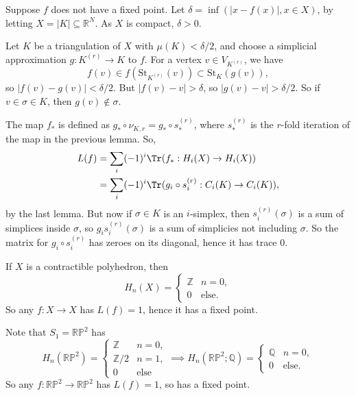 \documentclass[12pt]{article}
\begin{document}
\begin{proofbox}
	Suppose $f$ does not have a fixed point. Let $\delta = \inf(|x - f(x)|, x \in X)$, by letting $X = |K| \subseteq \mathbb{R}^N$. As $X$ is compact, $\delta > 0$.

	Let $K$ be a triangulation of $X$ with $\mu(K) < \delta/2$, and choose a simplicial approximation $g : K^{(r)} \to K$ to $f$. For a vertex $v \in V_{K^{(r)}}$, we have
	\[
		f(v) \in f(\mathrm{St}_{K^{(r)}}(v)) \subset \mathrm{St}_K(g(v)),
	\]
	so $|f(v) - g(v)| < \delta/2$. But $|f(v) - v| > \delta$, so $|g(v) - v| > \delta/2$. So if $v \in \sigma \in K$, then $g(v) \not \in \sigma$.

	The map $f_\ast$ is defined as $g_\ast \circ \nu_{K, r} = g_\ast \circ s_\ast^{(r)}$, where $s_\ast^{(r)}$ is the $r$-fold iteration of the map in the previous lemma. So,
	\begin{align*}
		L(f) &= \sum_i (-1)^i \Tr(f_\ast : H_i(X) \to H_i(X)) \\
		     &= \sum_i (-1)^i \Tr(g_i \circ s_i^{(r)} : C_i(K) \to C_i(K)),
	\end{align*}
	by the last lemma. But now if $\sigma \in K$ is an $i$-simplex, then $s_i^{(r)}(\sigma)$ is a sum of simplices inside $\sigma$, so $g_i s_i^{(r)}(\sigma)$ is a sum of simplicies not including $\sigma$. So the matrix for $g_i \circ s_i^{(r)}$ has zeroes on its diagonal, hence it has trace 0.
\end{proofbox}

\begin{exbox}
	If $X$ is a contractible polyhedron, then
	 \[
		 H_n(X) =
		 \begin{cases}
			 \mathbb{Z} & n = 0,\\
			 0 & \text{else}.
		 \end{cases}
	\]
	So any $f : X \to X$ has $L(f) = 1$, hence it has a fixed point.
\end{exbox}

\begin{exbox}
	Note that $S_1 = \mathbb{RP}^2$ has
	\[
	H_n(\mathbb{RP}^2) = 
	\begin{cases}
		\mathbb{Z} & n = 0,\\
		\mathbb{Z}/2 & n = 1,\\
		0 &\text{else}
	\end{cases} \implies H_n(\mathbb{RP}^2; \mathbb{Q}) =
	\begin{cases}
		\mathbb{Q} & n = 0, \\
		0 & \text{else}.
	\end{cases}
	\]
	So any $f : \mathbb{RP}^2 \to \mathbb{RP}^2$ has $L(f) = 1$, so has a fixed point.
\end{exbox}
\end{document}
